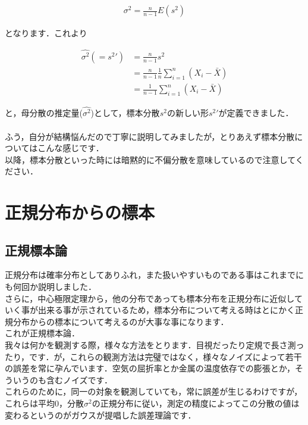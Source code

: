 \documentclass[11pt,a4paper,uplatex]{ujreport} 	%
\begin{document}
\begin{align}
  \sigma^2 = \frac{n}{n-1}E(s^2)
\end{align}

となります．これより

\begin{align}
  \hat{\sigma^2}(=s^2\prime) &= \frac{n}{n-1}s^2\\
                 &= \frac{n}{n-1}\frac{1}{n}\sum_{i=1}^n (X_i - \bar{X})\\
                 &= \frac{1}{n-1}\sum_{i=1}^n (X_i - \bar{X})
\end{align}

と，母分散の推定量($\hat{\sigma^2}$)として，標本分散$s^2$の新しい形$s^2\prime$が定義できました．\\
\\

ふう，自分が結構悩んだので丁寧に説明してみましたが，とりあえず標本分散についてはこんな感じです．\\

以降，標本分散といった時には暗黙的に不偏分散を意味しているので注意してください．

\section{正規分布からの標本}

\subsection{正規標本論}
正規分布は確率分布としてありふれ，また扱いやすいものである事はこれまでにも何回か説明しました．\\

さらに，中心極限定理から，他の分布であっても標本分布を正規分布に近似していく事が出来る事が示されているため，標本分布について考える時はとにかく正規分布からの標本について考えるのが大事な事になります．\\

これが正規標本論．\\

我々は何かを観測する際，様々な方法をとります．目視だったり定規で長さ測ったり，です．が，これらの観測方法は完璧ではなく，様々なノイズによって若干の誤差を常に孕んでいます．空気の屈折率とか金属の温度依存での膨張とか，そういうのも含むノイズです．\\

これらのために，同一の対象を観測していても，常に誤差が生じるわけですが，これらは平均0，分散$\sigma^2$の正規分布に従い，測定の精度によってこの分散の値は変わるというのがガウスが提唱した誤差理論です．\\
\end{document}
